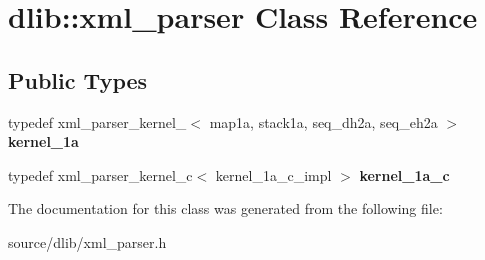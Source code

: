 \hypertarget{classdlib_1_1xml__parser}{
\section{dlib::xml\_\-parser Class Reference}
\label{classdlib_1_1xml__parser}
}
\subsection*{Public Types}
\begin{DoxyCompactItemize}
\item 
\hypertarget{classdlib_1_1xml__parser_a5961701f09130b8b44f399cb9ce4e71b}{
typedef xml\_\-parser\_\-kernel\_$<$ map1a, stack1a, seq\_\-dh2a, seq\_\-eh2a $>$ {\bfseries kernel\_\-1a}}
\label{classdlib_1_1xml__parser_a5961701f09130b8b44f399cb9ce4e71b}

\item 
\hypertarget{classdlib_1_1xml__parser_a67fe02d8b691747b1710405b60058563}{
typedef xml\_\-parser\_\-kernel\_\-c$<$ kernel\_\-1a\_\-c\_\-impl $>$ {\bfseries kernel\_\-1a\_\-c}}
\label{classdlib_1_1xml__parser_a67fe02d8b691747b1710405b60058563}

\end{DoxyCompactItemize}


The documentation for this class was generated from the following file:\begin{DoxyCompactItemize}
\item 
source/dlib/xml\_\-parser.h\end{DoxyCompactItemize}
